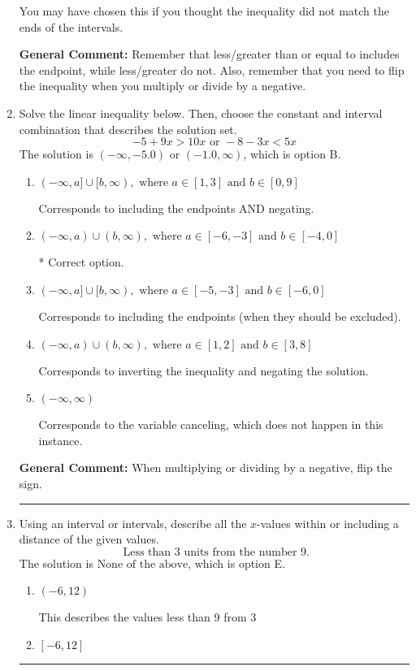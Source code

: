 \documentclass{extbook}[14pt]
\newcommand{\litem}[1]{\item #1

\rule{\textwidth}{0.4pt}}
\begin{document}
\begin{enumerate}
{\begin{enumerate}[label=\Alph*.]
You may have chosen this if you thought the inequality did not match the ends of the intervals.
\end{enumerate}

\textbf{General Comment:} Remember that less/greater than or equal to includes the endpoint, while less/greater do not. Also, remember that you need to flip the inequality when you multiply or divide by a negative.
}
\litem{
Solve the linear inequality below. Then, choose the constant and interval combination that describes the solution set.
\[ -5 + 9 x > 10 x \text{ or } -8 - 3 x < 5 x \]
The solution is \( (-\infty, -5.0) \text{ or } (-1.0, \infty) \), which is option B.\begin{enumerate}[label=\Alph*.]
\item \( (-\infty, a] \cup [b, \infty), \text{ where } a \in [1, 3] \text{ and } b \in [0, 9] \)

Corresponds to including the endpoints AND negating.
\item \( (-\infty, a) \cup (b, \infty), \text{ where } a \in [-6, -3] \text{ and } b \in [-4, 0] \)

 * Correct option.
\item \( (-\infty, a] \cup [b, \infty), \text{ where } a \in [-5, -3] \text{ and } b \in [-6, 0] \)

Corresponds to including the endpoints (when they should be excluded).
\item \( (-\infty, a) \cup (b, \infty), \text{ where } a \in [1, 2] \text{ and } b \in [3, 8] \)

Corresponds to inverting the inequality and negating the solution.
\item \( (-\infty, \infty) \)

Corresponds to the variable canceling, which does not happen in this instance.
\end{enumerate}

\textbf{General Comment:} When multiplying or dividing by a negative, flip the sign.
}
\litem{
Using an interval or intervals, describe all the $x$-values within or including a distance of the given values.
\[ \text{ Less than } 3 \text{ units from the number } 9. \]
The solution is \( \text{None of the above} \), which is option E.\begin{enumerate}[label=\Alph*.]
\item \( (-6, 12) \)

This describes the values less than 9 from 3
\item \( [-6, 12] \)


\end{enumerate}}
\end{enumerate}
\end{document}
